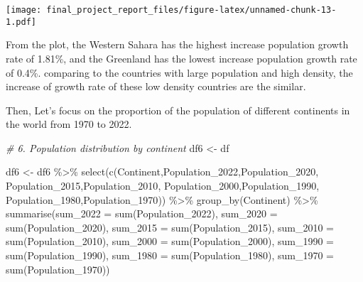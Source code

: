\documentclass[
]{article}
\newenvironment{Shaded}{\begin{snugshade}}{\end{snugshade}}
\newcommand{\AttributeTok}[1]{\textcolor[rgb]{0.77,0.63,0.00}{#1}}
\newcommand{\CommentTok}[1]{\textcolor[rgb]{0.56,0.35,0.01}{\textit{#1}}}
\newcommand{\FunctionTok}[1]{\textcolor[rgb]{0.00,0.00,0.00}{#1}}
\newcommand{\NormalTok}[1]{#1}
\newcommand{\OtherTok}[1]{\textcolor[rgb]{0.56,0.35,0.01}{#1}}
\newcommand{\SpecialCharTok}[1]{\textcolor[rgb]{0.00,0.00,0.00}{#1}}
\newcommand{\StringTok}[1]{\textcolor[rgb]{0.31,0.60,0.02}{#1}}
\begin{document}
\texttt{[image: final\_project\_report\_files/figure-latex/unnamed-chunk-13-1.pdf]}

From the plot, the Western Sahara has the highest increase population
growth rate of 1.81\%, and the Greenland has the lowest increase
population growth rate of 0.4\%. comparing to the countries with large
population and high density, the increase of growth rate of these low
density countries are the similar.

Then, Let's focus on the proportion of the population of different
continents in the world from 1970 to 2022.

\begin{Shaded}
\begin{Highlighting}[]
\CommentTok{\# 6. Population distribution by continent}
\NormalTok{df6 }\OtherTok{\textless{}{-}}\NormalTok{ df}

\NormalTok{df6 }\OtherTok{\textless{}{-}}\NormalTok{ df6 }\SpecialCharTok{\%\textgreater{}\%} \FunctionTok{select}\NormalTok{(}\FunctionTok{c}\NormalTok{(}\StringTok{\textquotesingle{}Continent\textquotesingle{}}\NormalTok{,}\StringTok{\textquotesingle{}Population\_2022\textquotesingle{}}\NormalTok{,}\StringTok{\textquotesingle{}Population\_2020\textquotesingle{}}\NormalTok{,}
                       \StringTok{\textquotesingle{}Population\_2015\textquotesingle{}}\NormalTok{,}\StringTok{\textquotesingle{}Population\_2010\textquotesingle{}}\NormalTok{,}
                      \StringTok{\textquotesingle{}Population\_2000\textquotesingle{}}\NormalTok{,}\StringTok{\textquotesingle{}Population\_1990\textquotesingle{}}\NormalTok{,}
                      \StringTok{\textquotesingle{}Population\_1980\textquotesingle{}}\NormalTok{,}\StringTok{\textquotesingle{}Population\_1970\textquotesingle{}}\NormalTok{)) }\SpecialCharTok{\%\textgreater{}\%} \FunctionTok{group\_by}\NormalTok{(Continent) }\SpecialCharTok{\%\textgreater{}\%}
  \FunctionTok{summarise}\NormalTok{(}\AttributeTok{sum\_2022 =} \FunctionTok{sum}\NormalTok{(Population\_2022),}
            \AttributeTok{sum\_2020 =} \FunctionTok{sum}\NormalTok{(Population\_2020),}
            \AttributeTok{sum\_2015 =} \FunctionTok{sum}\NormalTok{(Population\_2015),}
            \AttributeTok{sum\_2010 =} \FunctionTok{sum}\NormalTok{(Population\_2010),}
            \AttributeTok{sum\_2000 =} \FunctionTok{sum}\NormalTok{(Population\_2000),}
            \AttributeTok{sum\_1990 =} \FunctionTok{sum}\NormalTok{(Population\_1990),}
            \AttributeTok{sum\_1980 =} \FunctionTok{sum}\NormalTok{(Population\_1980),}
            \AttributeTok{sum\_1970 =} \FunctionTok{sum}\NormalTok{(Population\_1970))}


\end{Highlighting}
\end{Shaded}
\end{document}
